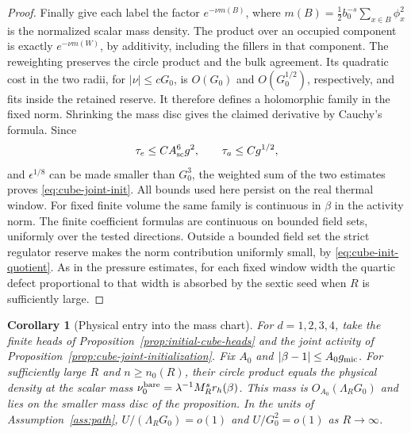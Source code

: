 \documentclass[11pt]{article}
\newtheorem{corollary}[theorem]{Corollary}
\theoremstyle{definition}
\begin{document}
\begin{proof}
Finally give each label the factor \(e^{-\nu m(B)}\), where
\(m(B)=\frac12 b_0^{-s}\sum_{x\in B}\phi_x^2\) is the
normalized scalar mass density. The product over an occupied
component is exactly \(e^{-\nu m(W)}\), by additivity, including
the fillers in that component. The reweighting preserves the
circle product and the bulk agreement. Its quadratic cost
in the two radii, for \(|\nu|\le cG_0\), is \(O(G_0)\) and
\(O(G_0^{1/2})\), respectively, and fits inside the retained
reserve. It therefore defines a holomorphic family in the
fixed norm. Shrinking the mass disc gives the claimed derivative
by Cauchy's formula. Since
\begin{equation}
 \tau_e\le C A_{\rm sc}^6 g^2,\qquad
 \tau_a\le Cg^{1/2},
\end{equation}
and \(\epsilon^{1/8}\) can be made smaller than \(G_0^3\),
the weighted sum of the two estimates proves
\eqref{eq:cube-joint-init}. All bounds used here persist on
the real thermal window. For fixed finite volume the same family
is continuous in \(\beta\) in the activity norm. The finite coefficient
formulas are continuous on bounded field sets, uniformly over the
tested directions. Outside a bounded field set the strict regulator
reserve makes the norm contribution uniformly small, by
\eqref{eq:cube-init-quotient}. As in the pressure estimates, for
each fixed window width the quartic defect proportional to
that width is absorbed by the sextic seed when \(R\) is
sufficiently large.
\end{proof}

\begin{corollary}[Physical entry into the mass chart]
\label{cor:physical-mass-entry}
For \(d=1,2,3,4\), take the finite heads of
Proposition~\ref{prop:initial-cube-heads} and the joint activity of
Proposition~\ref{prop:cube-joint-initialization}. Fix \(A_0\) and
\(\lvert\beta-1\rvert\le A_0g_{\rm mic}\). For sufficiently large
\(R\) and \(n\ge n_0(R)\), their circle product equals the physical
density at the scalar mass
\(\nu_0^{\rm bare}=\lambda^{-1}M_R^s r_h(\beta)\). This mass is
\(O_{A_0}(\Lambda_R G_0)\) and lies on the smaller mass disc of the
proposition. In the units of Assumption~\ref{ass:path},
\(U/(\Lambda_R G_0)=o(1)\) and \(U/G_0^2=o(1)\) as \(R\to\infty\).
\end{corollary}
\end{document}
